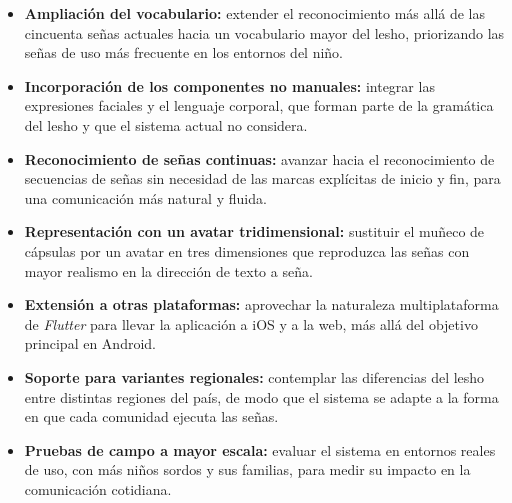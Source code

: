 \begin{itemize}
    \item \textbf{Ampliación del vocabulario:} extender el reconocimiento más allá de las cincuenta señas actuales hacia un vocabulario mayor del \Acrshort{lesho}, priorizando las señas de uso más frecuente en los entornos del niño.
    \item \textbf{Incorporación de los componentes no manuales:} integrar las expresiones faciales y el lenguaje corporal, que forman parte de la gramática del \Acrshort{lesho} y que el sistema actual no considera.
    \item \textbf{Reconocimiento de señas continuas:} avanzar hacia el reconocimiento de secuencias de señas sin necesidad de las marcas explícitas de inicio y fin, para una comunicación más natural y fluida.
    \item \textbf{Representación con un avatar tridimensional:} sustituir el muñeco de cápsulas por un avatar en tres dimensiones que reproduzca las señas con mayor realismo en la dirección de texto a seña.
    \item \textbf{Extensión a otras plataformas:} aprovechar la naturaleza multiplataforma de \textit{Flutter} para llevar la aplicación a iOS y a la web, más allá del objetivo principal en Android.
    \item \textbf{Soporte para variantes regionales:} contemplar las diferencias del \Acrshort{lesho} entre distintas regiones del país, de modo que el sistema se adapte a la forma en que cada comunidad ejecuta las señas.
    \item \textbf{Pruebas de campo a mayor escala:} evaluar el sistema en entornos reales de uso, con más niños sordos y sus familias, para medir su impacto en la comunicación cotidiana.
\end{itemize}
